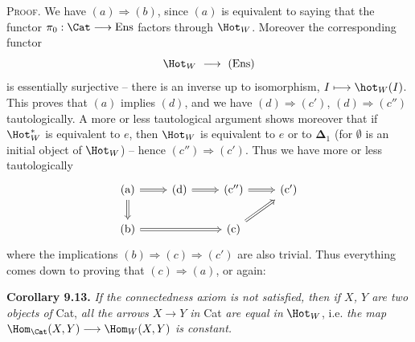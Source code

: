 \textsc{Proof}. We have $(a)\Longrightarrow(b)$, since $(a)$ is equivalent to saying that the functor $\pi_0:\Cat\longrightarrow\mathrm{Ens}$ factors through $\Hot_W$. Moreover the corresponding functor
\[
\Hot_W\ \longrightarrow\ (\mathrm{Ens})
\]
is essentially surjective -- there is an inverse up to isomorphism, $I\longmapsto\hot_W(I)$. This proves that $(a)$ implies $(d)$, and we have $(d)\Longrightarrow(c')$, $(d)\Longrightarrow(c'')$ tautologically. A more or less tautological argument shows moreover that if $\Hot_W^*$ is equivalent to $e$, then $\Hot_W$ is equivalent to $e$ or to $\boldsymbol{\Delta}_1$ (for $\emptyset$ is an initial object of $\Hot_W$) -- hence $(c'')\Longrightarrow(c')$. Thus we have more or less tautologically
\[
\begin{tikzcd}
(\mathrm{a}) \arrow[r, Rightarrow] \arrow[d, Rightarrow] & (\mathrm{d}) \arrow[r, Rightarrow] & (\mathrm{c}'') \arrow[r, Rightarrow] & (\mathrm{c}') \\
(\mathrm{b}) \arrow[rr, Rightarrow] & & (\mathrm{c}) \arrow[ru, Rightarrow] &
\end{tikzcd}
\]
where the implications $(b)\Longrightarrow(c)\Longrightarrow(c')$ are also trivial. Thus
everything comes down to proving that $(c)\Longrightarrow(a)$, or again:

\textbf{Corollary 9.13.} \textit{If the connectedness axiom is not satisfied, then if $X$, $Y$ are two objects of} Cat, \textit{all the arrows $X\longrightarrow Y$ in} Cat \textit{are equal in} $\Hot_W$, i.e. \textit{the map} $\Hom_{\Cat}(X,Y)\longrightarrow\Hom_W(X,Y)$ \textit{is constant.}

